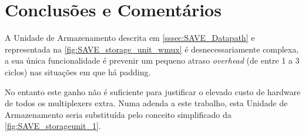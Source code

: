 \documentclass[a4paper]{article}
\begin{document}
\section{Conclusões e Comentários}

A Unidade de Armazenamento descrita em \ref{sssec:SAVE_Datapath} e representada na \autoref{fig:SAVE_storage_unit_wmux} é desnecessariamente complexa, a sua única funcionalidade é prevenir um pequeno atraso \textit{overhead} (de entre 1 a 3 ciclos) nas situações em que há padding.

No entanto este ganho não é suficiente para justificar o elevado custo de hardware de todos os multiplexers extra. Numa adenda a este trabalho, esta Unidade de Armazenamento seria substituída pelo conceito simplificado da \autoref{fig:SAVE_storageunit_1}.
\end{document}
